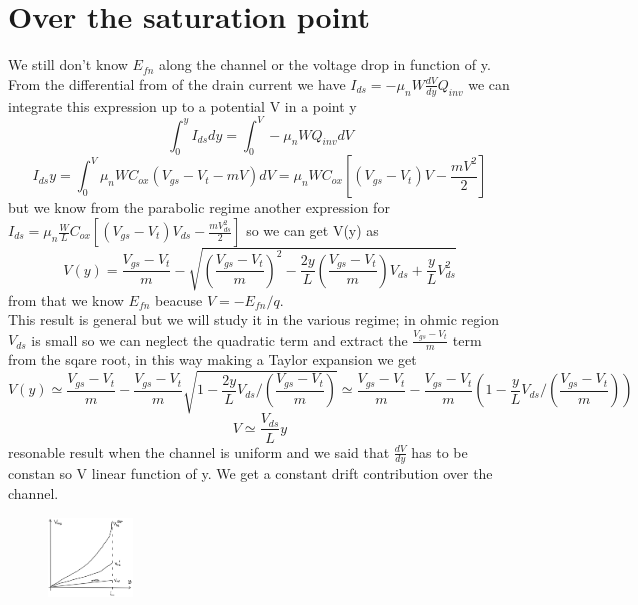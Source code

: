 \section{Over the saturation point}

We still don't know $E_{fn}$ along the channel or the voltage drop in function of y.\\
From the differential from of the drain current we have $I_{ds}=-\mu_nW \frac{dV}{dy}Q_{inv}$ we can integrate this expression up to a potential V in a point y
\begin{equation}
\int_0^yI_{ds}dy=\int^V_0-\mu_nWQ_{inv}dV
\end{equation}
\begin{equation}
I_{ds}y=\int^V_0\mu_nWC_{ox}(V_{gs}-V_t-mV)dV=\mu_nWC_{ox}[(V_{gs}-V_{t})V-\frac{mV^2}{2}]
\end{equation}
but we know from the parabolic regime another expression for $I_{ds}=\mu_n \frac{W}{L}C_{ox}[(V_{gs}-V_{t})V_{ds}-\frac{mV_{ds}^2}{2}]$ so we can get V(y) as
\begin{equation}
V(y)=\frac{V_{gs}-V_{t}}{m}-\sqrt{\left(\frac{V_{gs}-V_{t}}{m}\right)^2-\frac{2y}{L}\left(\frac{V_{gs}-V_{t}}{m}\right)V_{ds}+\frac{y}{L}V_{ds}^2}
\end{equation}
from that we know $E_{fn}$ beacuse $V=-E_{fn}/q$.\\
This result is general but we will study it in the various regime; in ohmic region $V_{ds}$ is small so we can neglect the quadratic term and extract the $\frac{V_{gs}-V_{t}}{m}$ term from the sqare root, in this way making a Taylor expansion we get
\begin{equation}
V(y)\simeq\frac{V_{gs}-V_{t}}{m}-\frac{V_{gs}-V_{t}}{m}\sqrt{1-\frac{2y}{L}V_{ds}/\left(\frac{V_{gs}-V_{t}}{m}\right)}\simeq \frac{V_{gs}-V_{t}}{m}-\frac{V_{gs}-V_{t}}{m}\left(1-\frac{y}{L}V_{ds}/\left(\frac{V_{gs}-V_{t}}{m}\right)\right)
\end{equation}
\begin{equation}
V\simeq \frac{V_{ds}}{L}y
\end{equation}
resonable result when the channel is uniform and we said that $\frac{dV}{dy}$ has to be constan so V linear function of y. We get a constant drift contribution over the channel.\\

\begin{figure}
\includegraphics[width=0.2\textwidth]{g1.png}
\end{figure}


